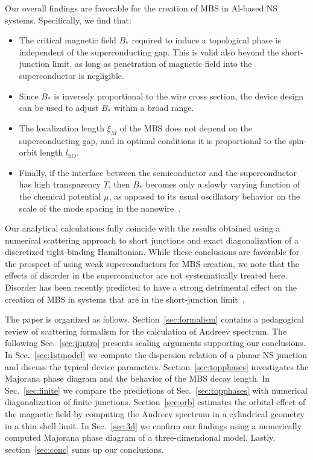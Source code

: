 \documentclass[twocolumn, notitlepage, 10pt, aps, floatfix, showpacs, prb, citeautoscript]{revtex4-1}
\newcommand{\comment}[1]{}
\begin{document}
\comment{We find that it is not so bad}
Our overall findings are favorable for the creation of MBS in Al-based NS systems.
Specifically, we find that:
\begin{itemize}
\item The critical magnetic field $B_*$ required to induce a topological phase is independent of the superconducting gap.
 This is valid also beyond the short-junction limit, as long as penetration of magnetic field into the superconductor is negligible.
\item Since $B_*$ is inversely proportional to the wire cross section, the device design can be used to adjust $B_*$ within a broad range.
\item The localization length $\xi_M$ of the MBS does not depend on the superconducting gap, and in optimal conditions it is proportional to the spin-orbit length $l_\textrm{SO}$.
\item Finally, if the interface between the semiconductor and the superconductor has high transparency $T$, then $B_*$ becomes only a slowly varying function of the chemical potential $\mu$, as opposed to its usual oscillatory behavior on the scale of the mode spacing in the nanowire~\cite{Wimmer2010, Lutchyn2011}.
\end{itemize}
Our analytical calculations fully coincide with the results obtained using a numerical scattering approach to short junctions and exact diagonalization of a discretized tight-binding Hamiltonian.
While these conclusions are favorable for the prospect of using weak superconductors for MBS creation, we note that the effects of disorder in the superconductor are not systematically treated here.
Disorder has been recently predicted to have a strong detrimental effect on the creation of MBS in systems that are in the short-junction limit~\cite{Cole2016}.

\comment{Organization of the paper}
The paper is organized as follows.
Section~\ref{sec:formalism} contains a pedagogical review of scattering formalism for the calculation of Andreev spectrum.
The following Sec.~\ref{sec:jjintro} presents scaling arguments supporting our conclusions.
In Sec.~\ref{sec:1stmodel} we compute the dispersion relation of a planar NS junction and discuss the typical device parameters.
Section~\ref{sec:topphases} investigates the Majorana phase diagram and the behavior of the MBS decay length.
In Sec.~\ref{sec:finite} we compare the predictions of Sec.~\ref{sec:topphases} with numerical diagonalization of finite junctions.
Section~\ref{sec:orb} estimates the orbital effect of the magnetic field by computing the Andreev spectrum in a cylindrical geometry in a thin shell limit.
In Sec.~\ref{sec:3d} we confirm our findings using a numerically computed Majorana phase diagram of a three-dimensional model.
Lastly, section~\ref{sec:conc} sums up our conclusions.
\end{document}
